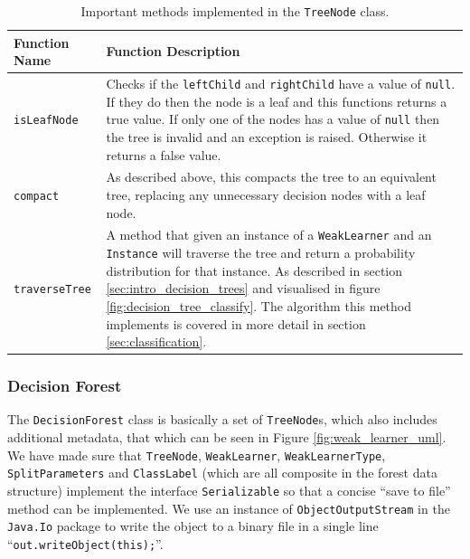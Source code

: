 \documentclass[12pt,twoside,notitlepage]{report}
\begin{document}
                \begin{table}[H]
                    \begin{tabularx}{\textwidth}{l|X}
                        \textbf{Function Name} & \textbf{Function Description} \\
                        \hline

                        \texttt{isLeafNode} & 
                            Checks if the \texttt{leftChild} and \texttt{rightChild} have a value of \texttt{null}. If 
                            they do then the node is a leaf and this functions returns a true value. If only one of the 
                            nodes has a value of \texttt{null} then the tree is invalid and an exception is raised. 
                            Otherwise it returns a false value. \\ 
                        \hline

                        \texttt{compact} & 
                            As described above, this compacts the tree to an equivalent tree, replacing any unnecessary 
                            decision nodes with a leaf node. \\ 
                        \hline

                        \texttt{traverseTree} &
                            A method that given an instance of a \texttt{WeakLearner} and an \texttt{Instance} will 
                            traverse the tree and return a probability distribution for that instance. As described in 
                            section \ref{sec:intro_decision_trees} and visualised in figure 
                            \ref{fig:decision_tree_classify}. The algorithm this method implements is covered in more 
                            detail in section \ref{sec:classification}.

                    \end{tabularx}
                    \caption{Important methods implemented in the \texttt{TreeNode} class.}
                    \label{tab:TreeNode}
                \end{table}




            \subsubsection{Decision Forest} \label{sec:DecisionForest}
                The \texttt{DecisionForest} class is basically a set of \texttt{TreeNode}s, which also includes 
                additional metadata, that which can be seen in Figure \ref{fig:weak_learner_uml}. 
                We have made sure that \texttt{TreeNode}, \texttt{WeakLearner}, \texttt{WeakLearnerType}, 
                \texttt{SplitParameters} and \texttt{ClassLabel} (which are all composite in the forest data structure) 
                implement the interface \texttt{Serializable} so that a concise ``save to file'' method can be 
                implemented. We use an instance of \texttt{ObjectOutputStream} in the \texttt{Java.Io} package 
                to write the object to a binary file in a single line ``\texttt{out.writeObject(this);}''.
\end{document}
